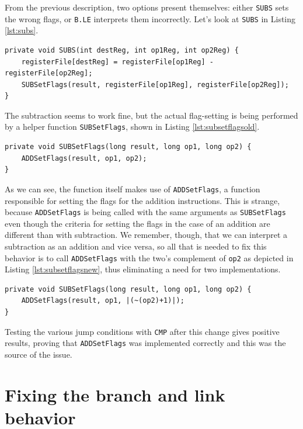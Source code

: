 From the previous description, two options present themselves: either \verb|SUBS| sets the wrong flags, or \verb|B.LE| interprets them incorrectly. Let's look at \verb|SUBS| in Listing \ref{lst:subs}.
\begin{lstlisting}[float, caption={SUBS' implementation}, label={lst:subs}]
private void SUBS(int destReg, int op1Reg, int op2Reg) {
    registerFile[destReg] = registerFile[op1Reg] - registerFile[op2Reg];
    SUBSetFlags(result, registerFile[op1Reg], registerFile[op2Reg]);
}
\end{lstlisting}
The subtraction seems to work fine, but the actual flag-setting is being performed by a helper function \verb|SUBSetFlags|, shown in Listing \ref{lst:subsetflagsold}.
\begin{lstlisting}[float, caption={Function that sets SUBS' flags}, label={lst:subsetflagsold}]
private void SUBSetFlags(long result, long op1, long op2) {
	ADDSetFlags(result, op1, op2);
}
\end{lstlisting}
As we can see, the function itself makes use of  \verb|ADDSetFlags|, a function responsible for setting the flags for the addition instructions. This is strange, because \verb|ADDSetFlags| is being called with the same arguments as \verb|SUBSetFlags| even though the criteria for setting the flags in the case of an addition are different than with subtraction. We remember, though, that we can interpret a subtraction as an addition and vice versa, so all that is needed to fix this behavior is to call \verb|ADDSetFlags| with the two's complement of \verb|op2| as depicted in Listing \ref{lst:subsetflagsnew}, thus eliminating a need for two implementations.
\begin{lstlisting}[float, caption={The fixed function}, label={lst:subsetflagsnew}]
private void SUBSetFlags(long result, long op1, long op2) {
    ADDSetFlags(result, op1, |(~(op2)+1)|);
}
\end{lstlisting}
Testing the various jump conditions with \verb|CMP| after this change gives positive results, proving that \verb|ADDSetFlags| was implemented correctly and this was the source of the issue.
\section{Fixing the branch and link behavior}

